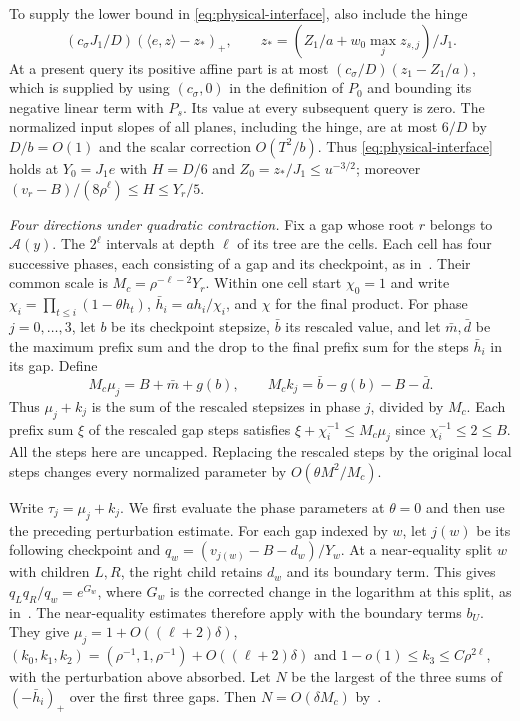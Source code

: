\documentclass[11pt]{article}
\theoremstyle{definition}
\begin{document}
To supply the lower bound in \eqref{eq:physical-interface}, also include the hinge
\[
 (c_\sigma J_1/D)(\langle e,z\rangle-z_*)_+,\qquad
 z_*=(Z_1/a+w_0\max_j z_{s,j})/J_1 .
\]
At a present query its positive affine part is at most $(c_\sigma/D)(z_1-Z_1/a)$, which is supplied by using $(c_\sigma,0)$ in the definition of $P_0$ and bounding its negative linear term with $P_s$. Its value at every subsequent query is zero. The normalized input slopes of all planes, including the hinge, are at most $6/D$ by $D/b=O(1)$ and the scalar correction $O(T^2/b)$. Thus \eqref{eq:physical-interface} holds at $Y_0=J_1e$ with $H=D/6$ and $Z_0=z_*/J_1\le u^{-3/2}$; moreover $(v_r-B)/(8\rho^\ell)\le H\le Y_r/5$.

\smallskip\noindent\emph{Four directions under quadratic contraction.}
Fix a gap whose root $r$ belongs to $\mathcal A(y)$. The $2^\ell$ intervals at depth $\ell$ of its tree are the cells. Each cell has four successive phases, each consisting of a gap and its checkpoint, as in~\cite[(6.12), (6.55)--(6.58)]{JH}. Their common scale is $M_c=\rho^{-\ell-2}Y_r$. Within one cell start $\chi_0=1$ and write $\chi_i=\prod_{t\le i}(1-\theta h_t)$, $\bar h_i=a h_i/\chi_i$, and $\chi$ for the final product. For phase $j=0,\ldots,3$, let $b$ be its checkpoint stepsize, $\bar b$ its rescaled value, and let $\bar m,\bar d$ be the maximum prefix sum and the drop to the final prefix sum for the steps $\bar h_i$ in its gap. Define
\[
 M_c\mu_j=B+\bar m+g(b),\qquad M_c k_j=\bar b-g(b)-B-\bar d .
\]
Thus $\mu_j+k_j$ is the sum of the rescaled stepsizes in phase $j$, divided by $M_c$. Each prefix sum $\xi$ of the rescaled gap steps satisfies $\xi+\chi_i^{-1}\le M_c\mu_j$ since $\chi_i^{-1}\le2\le B$. All the steps here are uncapped. Replacing the rescaled steps by the original local steps changes every normalized parameter by $O(\theta M^2/M_c)$.

Write \(\tau_j=\mu_j+k_j\). We first evaluate the phase parameters
at \(\theta=0\) and then use the preceding perturbation estimate. For each gap indexed by $w$, let $j(w)$ be its following checkpoint and $q_w=(v_{j(w)}-B-d_w)/Y_w$. At a near-equality split $w$ with children $L,R$, the right child retains $d_w$ and its boundary term. This gives $q_Lq_R/q_w=e^{G_w}$, where $G_w$ is the corrected change in the logarithm at this split, as in~\cite[(6.9)--(6.10)]{JH}. The near-equality estimates \cite[(6.51)--(6.60)]{JH} therefore apply with the boundary terms $b_U$. They give
$\mu_j=1+O((\ell+2)\delta)$, $(k_0,k_1,k_2)=(\rho^{-1},1,\rho^{-1})+O((\ell+2)\delta)$ and $1-o(1)\le k_3\le C\rho^{2\ell}$, with the perturbation above absorbed. Let \(N\) be the largest of the three sums of \((-\bar h_i)_+\) over the
first three gaps. Then $N=O(\delta M_c)$ by~\cite[(5.16)]{JH}.
\end{document}
